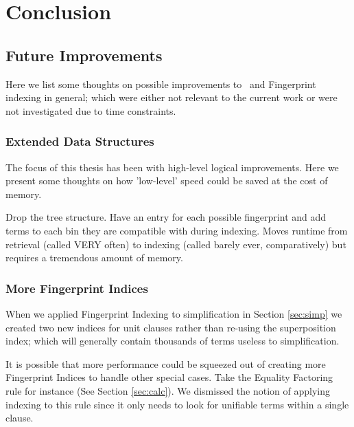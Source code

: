 
\chapter{Conclusion}
\label{cha:conclusion}

\section{}

\section{Future Improvements}
\label{sec:future}

Here we list some thoughts on possible improvements to \beagle\ and Fingerprint
indexing in general; which were either not relevant to the current work or
were not investigated due to time constraints.


\subsection{Extended Data Structures}
The focus of this thesis has been with high-level logical improvements. Here
we present some thoughts on how 'low-level' speed could be saved at the cost of memory.

Drop the tree structure. Have an entry for each possible fingerprint and add terms
to each bin they are compatible with during indexing. Moves runtime from
retrieval (called VERY often) to indexing (called barely ever, comparatively) but requires a
tremendous amount of memory.

\subsection{More Fingerprint Indices}

When we applied Fingerprint Indexing to simplification in Section \ref{sec:simp}
we created two new indices for unit clauses rather than re-using the superposition
index; which will generally contain thousands of terms useless to simplification.

It is possible that more performance could be squeezed out of creating more Fingerprint
Indices to handle other special cases. Take the Equality Factoring rule for instance
(See Section \ref{sec:calc}). We dismissed the notion of applying indexing to this rule
since it only needs to look for unifiable terms within a single clause. 

